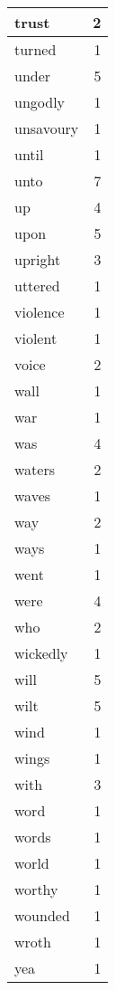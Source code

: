 \begin{center}
\begin{longtable}{l|r}
trust & 2 \\ \hline
turned & 1 \\ \hline
under & 5 \\ \hline
ungodly & 1 \\ \hline
unsavoury & 1 \\ \hline
until & 1 \\ \hline
unto & 7 \\ \hline
up & 4 \\ \hline
upon & 5 \\ \hline
upright & 3 \\ \hline
uttered & 1 \\ \hline
violence & 1 \\ \hline
violent & 1 \\ \hline
voice & 2 \\ \hline
wall & 1 \\ \hline
war & 1 \\ \hline
was & 4 \\ \hline
waters & 2 \\ \hline
waves & 1 \\ \hline
way & 2 \\ \hline
ways & 1 \\ \hline
went & 1 \\ \hline
were & 4 \\ \hline
who & 2 \\ \hline
wickedly & 1 \\ \hline
will & 5 \\ \hline
wilt & 5 \\ \hline
wind & 1 \\ \hline
wings & 1 \\ \hline
with & 3 \\ \hline
word & 1 \\ \hline
words & 1 \\ \hline
world & 1 \\ \hline
worthy & 1 \\ \hline
wounded & 1 \\ \hline
wroth & 1 \\ \hline
yea & 1 \\ \hline
\end{longtable}
\end{center}



\normalsize



